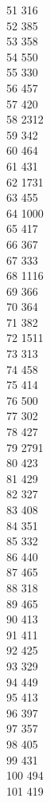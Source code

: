 { 51	316 \\
 52	385 \\
 53	358 \\
 54	550 \\
 55	330 \\
 56	457 \\
 57	420 \\
 58	2312 \\
 59	342 \\
 60	464 \\
 61	431 \\
 62	1731 \\
 63	455 \\
 64	1000 \\
 65	417 \\
 66	367 \\
 67	333 \\
 68	1116 \\
 69	366 \\
 70	364 \\
 71	382 \\
 72	1511 \\
 73	313 \\
 74	458 \\
 75	414 \\
 76	500 \\
 77	302 \\
 78	427 \\
 79	2791 \\
 80	423 \\
 81	429 \\
 82	327 \\
 83	408 \\
 84	351 \\
 85	332 \\
 86	440 \\
 87	465 \\
 88	318 \\
 89	465 \\
 90	413 \\
 91	411 \\
 92	425 \\
 93	329 \\
 94	449 \\
 95	413 \\
 96	397 \\
 97	357 \\
 98	405 \\
 99	431 \\
 100	494 \\
 101	419 \\
}
